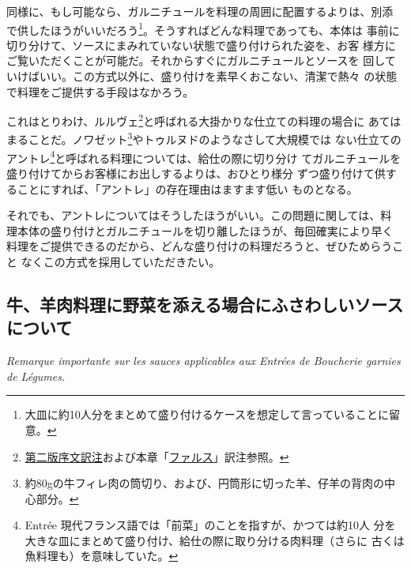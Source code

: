 同様に、もし可能なら、ガルニチュールを料理の周囲に配置するよりは、別添
で供したほうがいいだろう\footnote{大皿に約10人分をまとめて盛り付けるケースを想定して言っていることに留意。}。そうすればどんな料理であっても、本体は
事前に切り分けて、ソースにまみれていない状態で盛り付けられた姿を、お客
様方にご覧いただくことが可能だ。それからすぐにガルニチュールとソースを
回していけばいい。この方式以外に、盛り付けを素早くおこない、清潔で熱々
の状態で料理をご提供する手段はなかろう。

これはとりわけ、ルルヴェ\footnote{\protect\hyperlink{releve}{第二版序文訳注}および本章「\protect\hyperlink{farces}{ファルス}」訳注参照。}と呼ばれる大掛かりな仕立ての料理の場合に
あてはまることだ。ノワゼット\footnote{約80gの牛フィレ肉の筒切り、および、円筒形に切った羊、仔羊の背肉の中心部分。}やトゥルヌドのようなさして大規模では
ない仕立てのアントレ\footnote{Entrée
  現代フランス語では「前菜」のことを指すが、かつては約10人
  分を大きな皿にまとめて盛り付け、給仕の際に取り分ける肉料理（さらに
  古くは魚料理も）を意味していた。}と呼ばれる料理については、給仕の際に切り分け
てガルニチュールを盛り付けてからお客様にお出しするよりは、おひとり様分
ずつ盛り付けて供することにすれば、「アントレ」の存在理由はますます低い
ものとなる。

それでも、アントレについてはそうしたほうがいい。この問題に関しては、料
理本体の盛り付けとガルニチュールを切り離したほうが、毎回確実により早く
料理をご提供できるのだから、どんな盛り付けの料理だろうと、ぜひためらうこと
なくこの方式を採用していただきたい。

\hypertarget{remarque-importante-sur-les-sauces-applicables-aux-entrees-de-boucherie-garnie-de-legumes}{%
\subsection{牛、羊肉料理に野菜を添える場合にふさわしいソースについて}\label{remarque-importante-sur-les-sauces-applicables-aux-entrees-de-boucherie-garnie-de-legumes}}

\vspace{-1\zw}
\begin{center}
\textit{Remarque importante sur les sauces applicables aux Entrées de Boucherie garnies de Légumes.}
\end{center}


